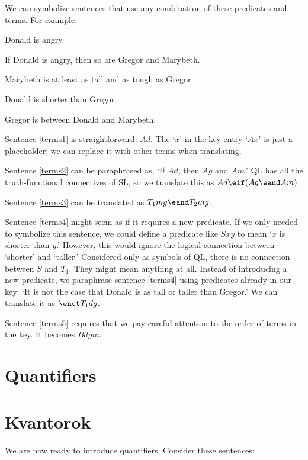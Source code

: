 We can symbolize sentences that use any combination of these predicates and terms. For example:
\begin{earg}
\item[\ex{terms1}] Donald is angry.
\item[\ex{terms2}] If Donald is angry, then so are Gregor and Marybeth.
\item[\ex{terms3}] Marybeth is at least as tall and as tough as Gregor.
\item[\ex{terms4}] Donald is shorter than Gregor.
\item[\ex{terms5}] Gregor is between Donald and Marybeth.
\end{earg}

Sentence \ref{terms1} is straightforward: $Ad$. The `$x$' in the key entry `$Ax$' is just a placeholder; we can replace it with other terms when translating.

Sentence \ref{terms2} can be paraphrased as, `If $Ad$, then $Ag$ and $Am$.' QL has all the truth-functional connectives of SL, so we translate this as $Ad \eif (Ag \eand Am)$.

Sentence \ref{terms3} can be translated as $T_1mg \eand T_2mg$.

Sentence \ref{terms4} might seem as if it requires a new predicate. If we only needed to symbolize this sentence, we could define a predicate like $Sxy$ to mean `$x$ is shorter than $y$.' However, this would ignore the logical connection between `shorter' and `taller.' Considered only as symbols of QL, there is no connection between $S$ and $T_1$. They might mean anything at all. Instead of introducing a new predicate, we paraphrase sentence \ref{terms4} using predicates already in our key: `It is not the case that Donald is as tall or taller than Gregor.' We can translate it as $\enot T_1dg$.

Sentence \ref{terms5} requires that we pay careful attention to the order of terms in the key. It becomes $Bdgm$.





\section{Quantifiers}
\section{Kvantorok}
We are now ready to introduce quantifiers. Consider these sentences:


